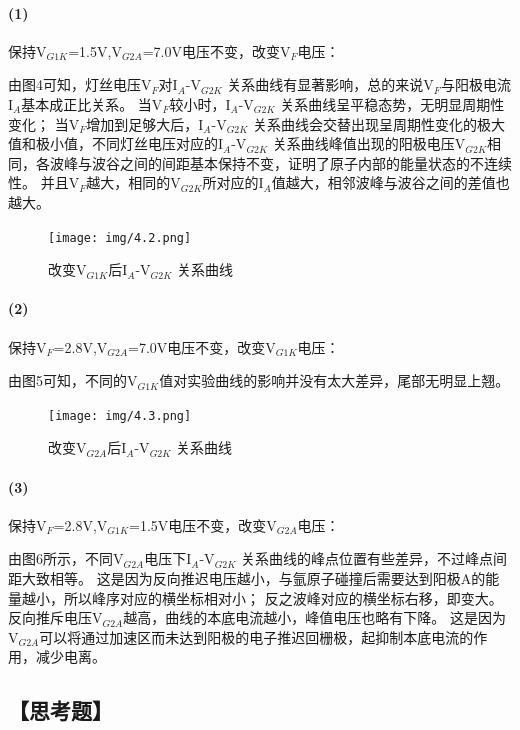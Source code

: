 \documentclass[12pt,a4paper,UTF8]{ctexart}
\begin{document}
	\paragraph*{(1)}
	保持V$_{G1K}$=1.5V,V$_{G2A}$=7.0V电压不变，改变V$_F$电压：

	由图4可知，灯丝电压V$_F$对I$_{A}$-V$_{G2K}$ 关系曲线有显著影响，总的来说V$_F$与阳极电流I$_A$基本成正比关系。
	当V$_F$较小时，I$_{A}$-V$_{G2K}$ 关系曲线呈平稳态势，无明显周期性变化；
	当V$_F$增加到足够大后，I$_{A}$-V$_{G2K}$ 关系曲线会交替出现呈周期性变化的极大值和极小值，不同灯丝电压对应的I$_{A}$-V$_{G2K}$ 关系曲线峰值出现的阳极电压V$_{G2K}$相同，各波峰与波谷之间的间距基本保持不变，证明了原子内部的能量状态的不连续性。
	并且V$_F$越大，相同的V$_{G2K}$所对应的I$_A$值越大，相邻波峰与波谷之间的差值也越大。

	\begin{figure}[htbp]
		\centering
		\texttt{[image: img/4.2.png]}
		\caption{改变V$_{G1K}$后I$_{A}$-V$_{G2K}$ 关系曲线}
	\end{figure}

	\paragraph*{(2)}
	保持V$_F$=2.8V,V$_{G2A}$=7.0V电压不变，改变V$_{G1K}$电压：

	由图5可知，不同的V$_{G1K}$值对实验曲线的影响并没有太大差异，尾部无明显上翘。

	\begin{figure}[htbp]
		\centering
		\texttt{[image: img/4.3.png]}
		\caption{改变V$_{G2A}$后I$_{A}$-V$_{G2K}$ 关系曲线}
	\end{figure}

	\paragraph*{(3)}
	保持V$_F$=2.8V,V$_{G1K}$=1.5V电压不变，改变V$_{G2A}$电压：

	由图6所示，不同V$_{G2A}$电压下I$_{A}$-V$_{G2K}$ 关系曲线的峰点位置有些差异，不过峰点间距大致相等。
	这是因为反向推迟电压越小，与氩原子碰撞后需要达到阳极A的能量越小，所以峰序对应的横坐标相对小；
	反之波峰对应的横坐标右移，即变大。
    反向推斥电压V$_{G2A}$越高，曲线的本底电流越小，峰值电压也略有下降。
    这是因为V$_{G2A}$可以将通过加速区而未达到阳极的电子推迟回栅极，起抑制本底电流的作用，减少电离。


\newpage

\subsection*{【思考题】}
\end{document}
